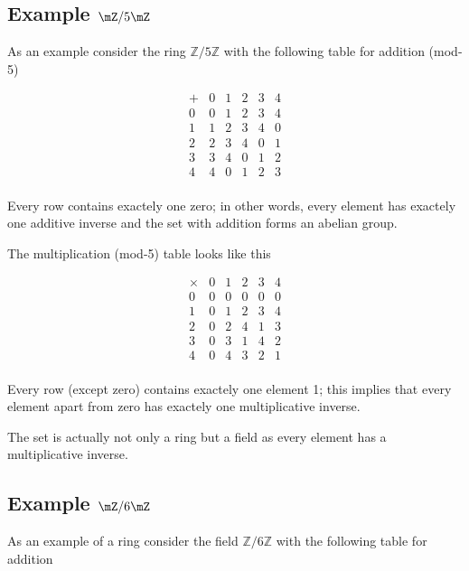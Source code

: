 
\subsection{Example $\mZ / 5\mZ$}

As an example consider the ring \(\mathbb{Z}/5\mathbb{Z}\) with the following table for addition (mod-5)

\[
\begin{array}{c|ccccc}
+  & 0 & 1 & 2 & 3 & 4 \\
\hline
0  & 0 & 1 & 2 & 3 & 4 \\
1  & 1 & 2 & 3 & 4 & 0 \\
2  & 2 & 3 & 4 & 0 & 1 \\
3  & 3 & 4 & 0 & 1 & 2 \\
4  & 4 & 0 & 1 & 2 & 3 \\
\end{array}
\]

Every row contains exactely one zero; in other words, every element has exactely one additive inverse and the set with addition forms an abelian group.

The multiplication (mod-5) table looks like this

\[
\begin{array}{c|ccccc}
\times  & 0 & 1 & 2 & 3 & 4 \\
\hline
      0 & 0 & 0 & 0 & 0 & 0 \\
      1 & 0 & 1 & 2 & 3 & 4 \\
      2 & 0 & 2 & 4 & 1 & 3 \\
      3 & 0 & 3 & 1 & 4 & 2 \\
      4 & 0 & 4 & 3 & 2 & 1 \\
\end{array}
\]

Every row (except zero) contains exactely one element 1; this implies that every element apart from zero has exactely one multiplicative inverse.

The set is actually not only a ring but a field as every element has a multiplicative inverse.

\subsection{Example $\mZ/6\mZ$}

As an example of a ring consider the field \(\mathbb{Z}/6\mathbb{Z}\) with the following table for addition

